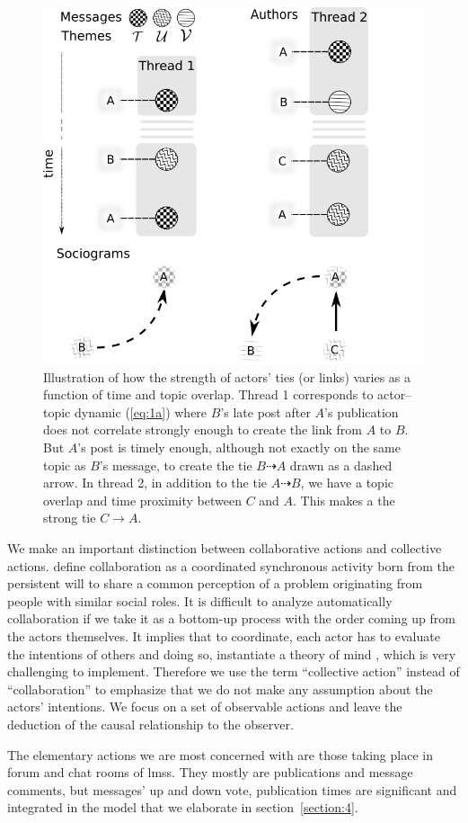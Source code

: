 \documentclass[a4paper,twoside]{article}
\begin{document}
\begin{figure}[b]
  \small{
    \caption{\label{fig:discussion}
      Illustration of how the strength of actors' ties (or links) varies as a function of time and topic overlap.  Thread 1 corresponds to actor--topic dynamic (\ref{eq:1a}) where $B$'s late post after $A$'s  publication does not correlate strongly enough to create the link from $A$ to $B$. But $A$'s  post is timely enough, although not exactly on the same topic as $B$'s message, to create the tie $B \dashrightarrow A$ drawn as a dashed arrow.  In thread 2, in addition to the tie $A \dashrightarrow B$, we have a topic overlap and time proximity between $C$ and $A$.  This makes a the strong tie $C \to A$.
    }}
  \centering
  \includegraphics[width=.45\textwidth]{images/discussion.png}
\end{figure}



We make an important distinction between collaborative actions and collective actions.  \cite{Dillenbourg1999} define collaboration as a coordinated synchronous activity born from the persistent will to share a common perception of a problem originating from people with similar social roles.  It is difficult to analyze automatically collaboration if we take it as a bottom-up process with the order coming up from the actors themselves.  It implies that to coordinate, each actor has to evaluate the intentions of others and doing so, instantiate a theory of mind \citep{Gerstenberg2017}, which is very challenging to implement.  Therefore we use the term ``collective action'' instead of ``collaboration'' to emphasize that we do not make any assumption about the actors' intentions.  We focus on a set of observable actions and leave the deduction of the causal relationship to the observer.

The elementary actions we are most concerned with are those taking place in forum and chat rooms of \glspl{lms}.  They mostly are publications and message comments, but messages' up and down vote, publication times are significant and integrated in the model that we elaborate in section~\ref{section:4}.
\end{document}
